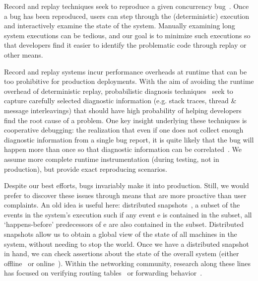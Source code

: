  Record and replay
techniques seek to reproduce a given concurrency
bug~\cite{zamfir2011debug,Zamfir:2010:EST:1755913.1755946,altekar2009odr,park2009pres,Yuan:2010:SED:1736020.1736038,ofrewind}.
Once a bug has been
reproduced, users can step through the (deterministic) execution and interactively examine the
state of the system.
Manually examining long system executions can be tedious, and our goal is to
minimize such executions so that developers find it easier to identify the
problematic code through replay or other means.

 Record and replay systems incur
performance overheads at runtime that can be too prohibitive for production deployments.
With the aim of avoiding the runtime overhead of deterministic replay, probabilistic diagnosis
techniques~\cite{Yuan:2010:SED:1736020.1736038,sangmin,kasikci2015failure} seek
to capture carefully selected diagnostic information (e.g. stack traces,
thread \& message interleavings) that should have high
probability of helping developers find the root cause of a problem. One key insight
underlying these techniques is cooperative debugging: the realization that
even if one does not collect enough diagnostic information from a single bug report,
it is quite likely that the bug will happen more than once so that diagnostic
information can be correlated~\cite{coop_debugging}.
We assume more complete runtime instrumentation (during testing, not in production), but provide exact reproducing scenarios.

 Despite our best efforts, bugs invariably make it into production. Still,
we would prefer to discover these issues through means that are more
proactive than user complaints. An old idea is useful here: distributed
snapshots~\cite{Chandy:1985:DSD:214451.214456},
a subset of the events in
the system's execution such if any event e is contained in the subset, all
`happens-before' predecessors of e are also contained in the subset.
Distributed snapshots allow us to obtain a global view of the state of all
machines in the system, without needing to stop the world. Once we have a
distributed snapshot in hand, we can check assertions about the state of the
overall system (either offline~\cite{Liu07widschecker} or online~\cite{d3s}).
Within the networking community, research along these lines has focused on
verifying routing tables~\cite{hsa,hsa_realtime,anteater,khurshid2012veriflow}
or forwarding behavior~\cite{Zeng:2012:ATP:2413176.2413205,libra}.


